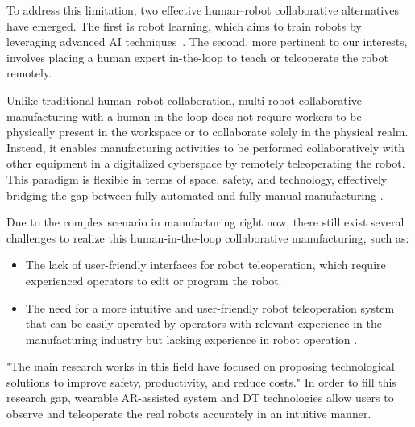    To address this limitation, two effective human--robot collaborative alternatives have emerged. The first is robot learning, which aims to train robots by leveraging advanced \ac{AI} techniques~\cite{6}. The second, more pertinent to our interests, involves placing a human expert in-the-loop to teach or teleoperate the robot remotely.

    
    Unlike traditional human--robot collaboration, multi-robot collaborative manufacturing with a human in the loop does not require workers to be physically present in the workspace or to collaborate solely in the physical realm. Instead, it enables manufacturing activities to be performed collaboratively with other equipment in a digitalized cyberspace by remotely teleoperating the robot. This paradigm is flexible in terms of space, safety, and technology, effectively bridging the gap between fully automated and fully manual manufacturing \cite{7}.

    
    Due to the complex scenario in manufacturing right now, there still exist several challenges to realize this human-in-the-loop collaborative manufacturing, such as:
    \begin{itemize}
        \item The lack of user-friendly interfaces for robot teleoperation, which require experienced operators to edit or program the robot.
        \item The need for a more intuitive and user-friendly robot teleoperation system that can be easily operated by operators with relevant experience in the manufacturing industry but lacking experience in robot operation \cite{9}.
    \end{itemize}

    "The main research works in this field have focused on proposing technological solutions to improve safety, productivity, and reduce costs."
    In order to fill this research gap, wearable \ac{AR}-assisted system and \ac{DT} technologies allow users to observe and teleoperate the real robots accurately in an intuitive manner. 

